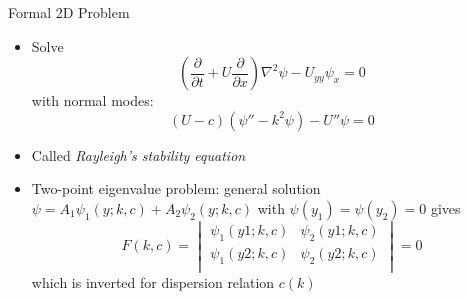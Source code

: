 \documentclass[landscape]{seminar}
\newcommand{\pdiff}[2]{\frac{\partial #1}{\partial #2}}
\begin{document}
\begin{slide}

\begin{center}Formal 2D Problem\end{center}

\begin{itemize}
  \item Solve
\begin{equation}
\left(\pdiff{}{t} + U \pdiff{}{x} \right) \nabla^2 \psi - U_{yy} \psi_x = 0
\end{equation}
with normal modes:
\begin{equation}
\left(U - c\right) \left(\psi'' - k^2 \psi \right) - U'' \psi = 0
\end{equation}

  \item Called \emph{Rayleigh's stability equation}

  \item Two-point eigenvalue problem: general solution $\psi = A_1\psi_1(y;k,c) + A_2\psi_2(y;k,c)$ with $\psi(y_1) = \psi(y_2) = 0$ gives
\begin{equation*}
F(k, c) = \begin{vmatrix} \psi_1(y1; k, c) & \psi_2(y1; k, c) \\ \psi_1(y2; k, c) & \psi_2(y2; k, c) \\ \end{vmatrix} = 0
\end{equation*}
which is inverted for dispersion relation $c(k)$

\end{itemize}

\end{slide}
\end{document}
